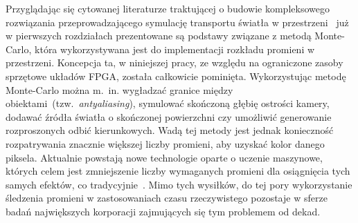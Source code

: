 Przyglądając się cytowanej literaturze traktującej o budowie kompleksowego rozwiązania przeprowadzającego symulację transportu światła w przestrzeni~\cite{PBRT}\cite{RTFTGU} już w pierwszych rozdziałach prezentowane są podstawy związane z metodą Monte-Carlo, która wykorzystywana jest do implementacji rozkładu promieni w przestrzeni. Koncepcja ta, w niniejszej pracy, ze względu na ograniczone zasoby sprzętowe układów FPGA, została całkowicie pominięta. Wykorzystując metodę Monte-Carlo można m.~in. wygładzać granice między obiektami~(tzw.~\textit{antyaliasing}), symulować skończoną głębię ostrości kamery, dodawać źródła światła o skończonej powierzchni czy umożliwić generowanie rozproszonych odbić kierunkowych. Wadą tej metody jest jednak konieczność rozpatrywania znacznie większej liczby promieni, aby uzyskać kolor danego piksela. Aktualnie powstają nowe technologie oparte o uczenie maszynowe, których celem jest zmniejszenie liczby wymaganych promieni dla osiągnięcia tych samych efektów, co tradycyjnie~\cite{NVIDIA_JENSEN}\cite{NVIDIA_DEMO}. Mimo tych wysiłków, do tej pory wykorzystanie śledzenia promieni w zastosowaniach czasu rzeczywistego pozostaje w sferze badań największych korporacji zajmujących się tym problemem od dekad.




%





